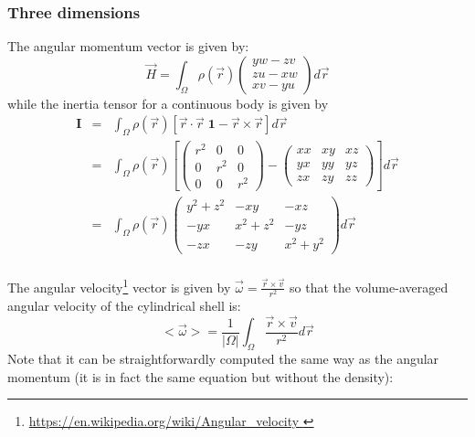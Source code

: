  

\subsubsection{Three dimensions}

The angular momentum vector is given by:
\begin{equation}
\vec H = \int_\Omega \rho(\vec r) \left( 
\begin{array}{c} 
yw-zv \\ zu-xw \\ xv-yu 
\end{array} \right) d\vec r
\end{equation}
while the inertia tensor for a continuous body is given 
by
\begin{eqnarray}
\bm I
&=&\int_\Omega \rho(\vec r) [\vec r\cdot\vec r \; \bm 1 - \vec r \times \vec r  ] d\vec r \\
&=&\int_\Omega \rho(\vec r) 
\left[
\left(
\begin{array}{ccc}
r^2 & 0 & 0 \\
0 & r^2 & 0 \\
0 & 0 & r^2
\end{array}
\right)
- 
\left(
\begin{array}{ccc}
xx & xy & xz \\
yx & yy & yz \\
zx & zy & zz 
\end{array}
\right)
\right] 
d\vec r \\
&=&\int_\Omega \rho(\vec r) 
\left(
\begin{array}{ccc}
y^2+z^2 & -xy & -xz \\
-yx & x^2+z^2 & -yz \\
-zx & -zy & x^2+y^2 
\end{array}
\right)
d\vec r \\
\end{eqnarray}

The angular velocity\footnote{\url{https://en.wikipedia.org/wiki/Angular_velocity }}
 vector is given by $\vec\omega = \frac{\vec r\times \vec v}{r^2}$
so that the volume-averaged angular velocity of the cylindrical shell is:
\[
<\vec {\omega}> = \frac{1}{|\Omega|} \int_\Omega \frac{{\vec r}\times {\vec v}}{r^2} d\vec r
\]
 Note that it can be straightforwardly computed the same way as the angular momentum
(it is in fact the same equation but without the density):

